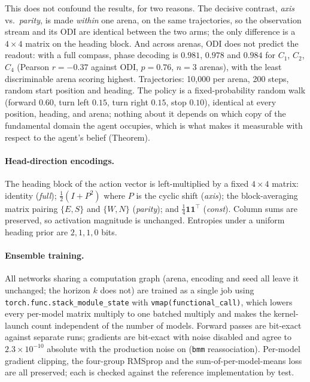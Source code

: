 \documentclass[9pt,lineno]{elife}
\begin{document}
This does not confound the results, for two reasons. The decisive contrast, \textit{axis} vs.\
\textit{parity}, is made \emph{within} one arena, on the same trajectories, so the observation
stream and its ODI are identical between the two arms; the only difference is a $4\times4$ matrix
on the heading block. And across arenas, ODI does not predict the readout: with a full compass,
phase decoding is $0.981$, $0.978$ and $0.984$ for $C_1$, $C_2$, $C_4$ (Pearson $r=-0.37$ against
ODI, $p=0.76$, $n=3$ arenas), with the least discriminable arena scoring highest. Trajectories:
10{,}000 per arena, 200 steps, random start position and heading. The policy is a fixed-probability
random walk (forward $0.60$, turn left $0.15$, turn right $0.15$, stop $0.10$), identical at every
position, heading, and arena; nothing about it depends on which copy of the fundamental domain the
agent occupies, which is what makes it measurable with respect to the agent's belief (Theorem).

\paragraph{Head-direction encodings.} The heading block of the action vector is left-multiplied
by a fixed $4\times4$ matrix: identity (\textit{full}); $\tfrac12(I + P^2)$ where $P$ is the
cyclic shift (\textit{axis}); the block-averaging matrix pairing $\{E,S\}$ and $\{W,N\}$
(\textit{parity}); and $\tfrac14\mathbf{1}\mathbf{1}^\top$ (\textit{const}). Column sums are
preserved, so activation magnitude is unchanged. Entropies under a uniform heading prior are
$2, 1, 1, 0$ bits.

\paragraph{Ensemble training.} All networks sharing a computation graph (arena, encoding and seed
all leave it unchanged; the horizon $k$ does not) are trained as a single job using
\texttt{torch.func.stack\_module\_state} with \texttt{vmap(functional\_call)}, which lowers every
per-model matrix multiply to one batched multiply and makes the kernel-launch count independent
of the number of models. Forward passes are bit-exact against separate runs; gradients are
bit-exact with noise disabled and agree to $2.3\times10^{-10}$ absolute with the production noise
on (\texttt{bmm} reassociation). Per-model gradient clipping, the four-group RMSprop and the
sum-of-per-model-means loss are all preserved; each is checked against the reference
implementation by test.
\end{document}
